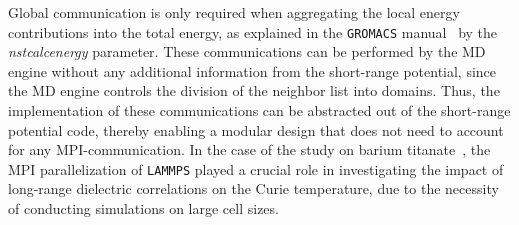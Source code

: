 Global communication is only required when aggregating the local energy contributions into the total energy, as explained in the \texttt{GROMACS} manual~\cite{gromacsnstcalcenergy} by the \emph{nstcalcenergy} parameter.
These communications can be performed by the MD engine without any additional information from the short-range potential, since the MD engine controls the division of the neighbor list into domains.
Thus, the implementation of these communications can be abstracted out of the short-range potential code, thereby enabling a modular design that does not need to account for any MPI-communication.
In the case of the study on barium titanate~\cite{gigli2023modeling}, the MPI parallelization of \texttt{LAMMPS} played a crucial role in investigating the impact of long-range dielectric correlations on the Curie temperature, due to the necessity of conducting simulations on large cell sizes.

